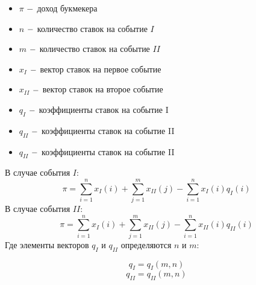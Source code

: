 \documentclass{article}
\begin{document}
\maketitle

\begin{itemize}
    \item $\pi$ $\--$ доход букмекера 
    \item $n$ $\--$ количество ставок на событие $I$
    \item $m$ $\--$ количество ставок на событие $II$
    \item $x_I$ $\--$ вектор ставок на первое событие
    \item $x_{II}$ $\--$ вектор ставок на второе событие
    \item $q_I$ $\--$ коэффициенты ставок на событие I
    \item $q_{II}$ $\--$ коэффициенты ставок на событие II
    \item $q_{II}$ $\--$ коэффициенты ставок на событие II
    \end{itemize}
    В случае события $I$:
    \[
        \pi = \sum_{i=1}^n x_I(i) + \sum_{j=1}^m x_{II}(j) -   \sum_{i=1}^n x_I(i)q_I(i)
    \]
    В случае события $II$:
    \[
        \pi = \sum_{i=1}^n x_I(i) + \sum_{j=1}^m x_{II}(j) -   \sum_{i=1}^n x_{II}(i)q_{II}(i)
    \]
    Где элементы векторов $q_I$ и $q_{II}$ определяются $n$ и $m$:
   
    \[
        q_I = q_I(m,n)  
    \]
        \[
        q_{II}= q_{II}(m,n)  
    \]
\end{document}
